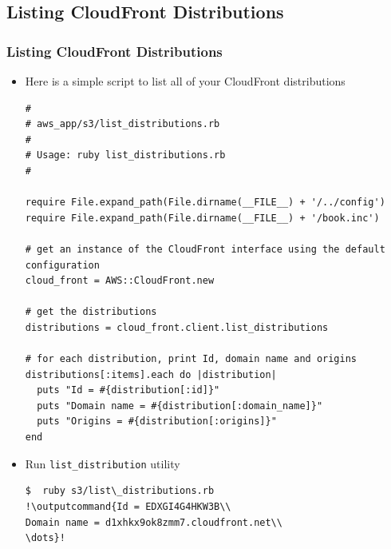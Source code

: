 \documentclass{beamer}
\newcommand{\outputcommand}[1]{\color{darkgreen}{#1}}
\begin{document}
\subsection{Listing CloudFront Distributions}
\begin{frame}
\frametitle{Listing CloudFront Distributions}
\begin{itemize}
\item Here is a simple script to list all of your CloudFront distributions

\lstset{language=Ruby, style=eclipse}
\begin{lstlisting}[escapechar=!]
#
# aws_app/s3/list_distributions.rb
#
# Usage: ruby list_distributions.rb
#

require File.expand_path(File.dirname(__FILE__) + '/../config')
require File.expand_path(File.dirname(__FILE__) + '/book.inc')

# get an instance of the CloudFront interface using the default configuration
cloud_front = AWS::CloudFront.new

# get the distributions
distributions = cloud_front.client.list_distributions

# for each distribution, print Id, domain name and origins
distributions[:items].each do |distribution|
  puts "Id = #{distribution[:id]}"
  puts "Domain name = #{distribution[:domain_name]}"
  puts "Origins = #{distribution[:origins]}"
end
\end{lstlisting}

\item Run \texttt{list\_distribution} utility
\lstset{language=shell}
\begin{lstlisting}[escapechar=!]
$  ruby s3/list\_distributions.rb 
!\outputcommand{Id = EDXGI4G4HKW3B\\
Domain name = d1xhkx9ok8zmm7.cloudfront.net\\
\dots}!
\end{lstlisting} 
\end{itemize}
\end{frame}
\end{document}
